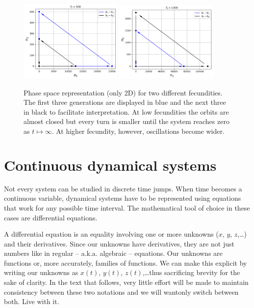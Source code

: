 \documentclass{tufte-book} %
\begin{document}
\begin{figure}
	\begin{center}
		\includegraphics[width=0.45\textwidth]{locusts_phaseIdec}
		\includegraphics[width=0.45\textwidth]{locusts_phaseIinc}
	\end{center}
	\caption{Phase space representation (only 2D) for two different fecundities. The first three generations are displayed in blue and the next three in black to facilitate interpretation. At low fecundities the orbits are almost closed but every turn is smaller until the system reaches zero as $t \mapsto \infty$. At higher fecundity, however, oscillations become wider.}
	 
	\label{fig:Llocusts_stability_pp}
\end{figure}

\FloatBarrier


\chapter{Continuous dynamical systems}

Not every system can be studied in discrete time jumps. When time becomes a continuous variable, dynamical systems have to be represented using equations that work for any possible time interval. The mathematical tool of choice in these cases are differential equations.


A differential equation is an equality involving one or more unknowns ($x$, $y$, $z$,\dots) and their derivatives. Since our unknowns have derivatives, they are not just numbers like in regular -- a.k.a. algebraic -- equations. Our unknowns are functions or, more accurately, families of functions. We can make this explicit by writing our unknowns as $x(t)$, $y(t)$, $z(t)$,\dots thus sacrificing brevity for the sake of clarity. In the text that follows, very little effort will be made to maintain consistency between these two notations and we will wantonly switch between both. Live with it.
\end{document}
